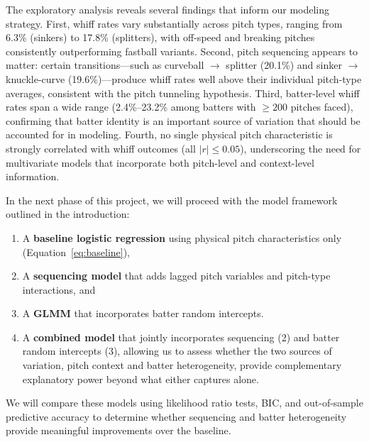 \documentclass[11pt]{article}
\newcommand{\batterLow}{2.4}             %
\newcommand{\batterHigh}{23.2}           %
\begin{document}
The exploratory analysis reveals several findings that inform our modeling strategy.
First, whiff rates vary substantially across pitch types, ranging from 6.3\% (sinkers) to 17.8\% (splitters), with off-speed and breaking pitches consistently outperforming fastball variants.
Second, pitch sequencing appears to matter: certain transitions---such as curveball $\rightarrow$ splitter (20.1\%) and sinker $\rightarrow$ knuckle-curve (19.6\%)---produce whiff rates well above their individual pitch-type averages, consistent with the pitch tunneling hypothesis.
Third, batter-level whiff rates span a wide range (\batterLow\%--\batterHigh\% among batters with $\geq 200$ pitches faced), confirming that batter identity is an important source of variation that should be accounted for in modeling.
Fourth, no single physical pitch characteristic is strongly correlated with whiff outcomes (all $|r| \leq 0.05$), underscoring the need for multivariate models that incorporate both pitch-level and context-level information.

In the next phase of this project, we will proceed with the model framework outlined in the introduction:
\begin{enumerate}[nosep]
    \item A \textbf{baseline logistic regression} using physical pitch characteristics only (Equation~\ref{eq:baseline}),
    \item A \textbf{sequencing model} that adds lagged pitch variables and pitch-type interactions, and
    \item A \textbf{GLMM} that incorporates batter random intercepts.
    \item A \textbf{combined model} that jointly incorporates sequencing (2) and batter random intercepts (3), allowing us to assess whether the two sources of variation, pitch context          and batter heterogeneity, provide complementary explanatory power beyond what either captures alone.
\end{enumerate}
We will compare these models using likelihood ratio tests, BIC, and out-of-sample predictive accuracy to determine whether sequencing and batter heterogeneity provide meaningful improvements over the baseline.


\newpage


\end{document}
